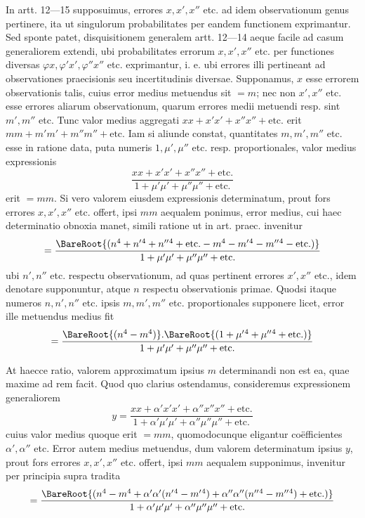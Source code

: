 In artt. 12---15 supposuimus, errores \(x,x',x''\) etc. ad idem observationum genus pertinere, ita ut singulorum probabilitates per eandem functionem exprimantur. Sed sponte patet, disquisitionem generalem artt. 12---14 aeque facile ad casum generaliorem extendi, ubi probabilitates errorum \(x,x',x''\) etc. per functiones diversas \(\varphi x,\varphi'x',\varphi''x''\) etc. exprimantur, i. e. ubi errores illi pertineant ad observationes praecisionis seu incertitudinis diversae. Supponamus, \(x\) esse errorem observationis talis, cuius error medius metuendus sit \(=m\); nec non \(x',x''\) etc. esse errores aliarum observationum, quarum errores medii metuendi resp. sint \(m',m''\) etc. Tunc valor medius aggregati \(xx+x'x'+x''x''+\text{etc.}\) erit \(mm+m'm'+m''m''+\text{etc.}\) Iam si aliunde constat, quantitates \(m,m',m''\) etc. esse in ratione data, puta numeris \(1,\mu',\mu''\) etc. resp. proportionales, valor medius expressionis
\[
\frac{xx+x'x'+x''x''+\text{etc.}}{1+\mu'\mu'+\mu''\mu''+\text{etc.}}
\]
erit \(=mm\). Si vero valorem eiusdem expressionis determinatum, prout fors errores \(x,x',x''\) etc. offert, ipsi \(mm\) aequalem ponimus, error medius, cui haec determinatio obnoxia manet, simili ratione ut in art. praec. invenitur
\[
=\frac{\BareRoot{(n^4+n'{}^4+n''{}^4+\text{etc.}-m^4-m'{}^4-m''{}^4-\text{etc.})}}{1+\mu'\mu'+\mu''\mu''+\text{etc.}}
\]
ubi \(n',n''\) etc. respectu observationum, ad quas pertinent errores \(x',x''\) etc., idem denotare supponuntur, atque \(n\) respectu observationis primae. Quodsi itaque numeros \(n,n',n''\) etc. ipsis \(m,m',m''\) etc. proportionales supponere licet, error ille metuendus medius fit
\[
=\frac{\BareRoot{(n^4-m^4)}.\BareRoot{(1+\mu'{}^4+\mu''{}^4+\text{etc.})}}{1+\mu'\mu'+\mu''\mu''+\text{etc.}}
\]

At haecce ratio, valorem approximatum ipsius \(m\) determinandi non est ea, quae maxime ad rem facit. Quod quo clarius ostendamus, consideremus expressionem generaliorem
\[
y=\frac{xx+\alpha'x'x'+\alpha''x''x''+\text{etc.}}{1+\alpha'\mu'\mu'+\alpha''\mu''\mu''+\text{etc.}}
\]
cuius valor medius quoque erit \(=mm\), quomodocunque eligantur coëfficientes \(\alpha',\alpha''\) etc. Error autem medius metuendus, dum valorem determinatum ipsius \(y\), prout fors errores \(x,x',x''\) etc. offert, ipsi \(mm\) aequalem supponimus, invenitur per principia supra tradita
\[
=\frac{\BareRoot{(n^4-m^4+\alpha'\alpha'(n'{}^4-m'{}^4)+\alpha''\alpha''(n''{}^4-m''{}^4)+\text{etc.})}}{1+\alpha'\mu'\mu'+\alpha''\mu''\mu''+\text{etc.}}
\]
